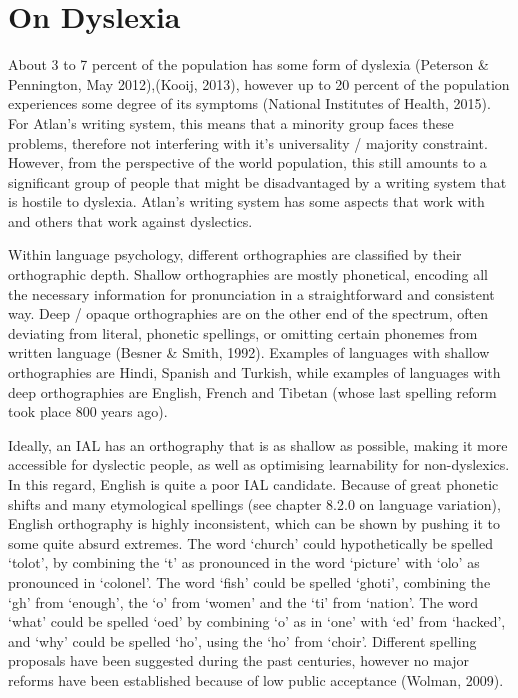 
 


\section{On Dyslexia }

About 3 to 7 percent of the population has some form of dyslexia (Peterson \& Pennington, May 2012),(Kooij, 2013), however up to 20 percent of the population experiences some degree of its symptoms (National Institutes of Health, 2015). For Atlan’s writing system, this means that a minority group faces these problems, therefore not interfering with it’s universality / majority constraint. However, from the perspective of the world population, this still amounts to a significant group of people that might be disadvantaged by a writing system that is hostile to dyslexia. Atlan’s writing system has some aspects that work with and others that work against dyslectics.  

Within language psychology, different orthographies are classified by their orthographic depth. Shallow orthographies are mostly phonetical, encoding all the necessary information for pronunciation in a straightforward and consistent way. Deep / opaque orthographies are on the other end of the spectrum, often deviating from literal, phonetic spellings, or omitting certain phonemes from written language (Besner \& Smith, 1992). Examples of languages with shallow orthographies are Hindi, Spanish and Turkish, while examples of languages with deep orthographies are English, French and Tibetan (whose last spelling reform took place 800 years ago).  

Ideally, an IAL has an orthography that is as shallow as possible, making it more accessible for dyslectic people, as well as optimising learnability for non-dyslexics. In this regard, English is quite a poor IAL candidate. Because of great phonetic shifts and many etymological spellings (see chapter 8.2.0 on language variation), English orthography is highly inconsistent, which can be shown by pushing it to some quite absurd extremes. The word ‘church’ could hypothetically be spelled ‘tolot’, by combining the ‘t’ as pronounced in the word ‘picture’ with ‘olo’ as pronounced in ‘colonel’. The word ‘fish’ could be spelled ‘ghoti’, combining the ‘gh’ from ‘enough’, the ‘o’ from ‘women’ and the ‘ti’ from ‘nation’. The word ‘what’ could be spelled ‘oed’ by combining ‘o’ as in ‘one’ with ‘ed’ from ‘hacked’, and ‘why’ could be spelled ‘ho’, using the ‘ho’ from ‘choir’. Different spelling proposals have been suggested during the past centuries, however no major reforms have been established because of low public acceptance (Wolman, 2009). 

